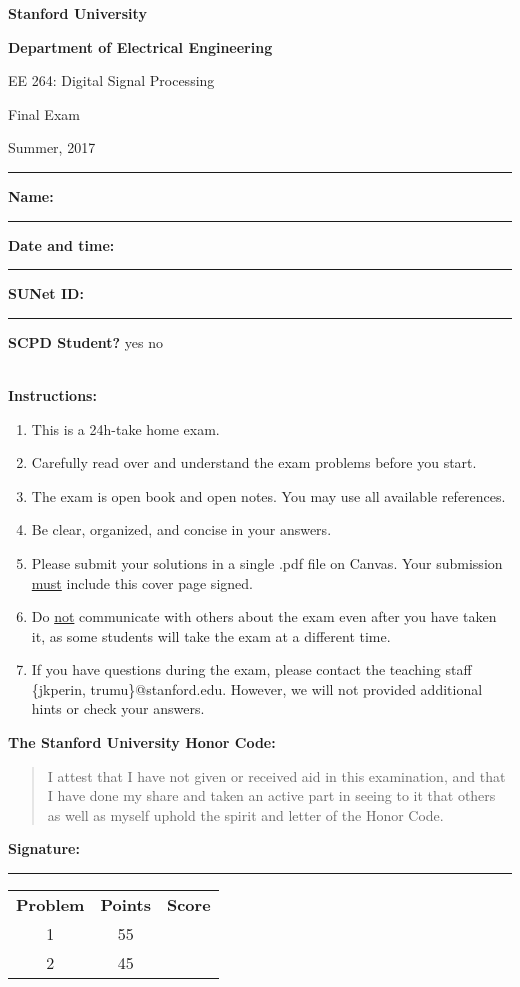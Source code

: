 \doublespacing
\begin{center}
\textbf{\Large Stanford University}

\textbf{\Large Department of Electrical Engineering}

\Large EE 264: Digital Signal Processing 

\Large Final Exam

\Large Summer, 2017
\end{center}
\vspace{-0.5cm}
\rule{\textwidth}{1pt}

\noindent\textbf{Name:} \rule{0.4\textwidth}{0.5pt} \qquad  \textbf{Date and time:} \rule{0.3\textwidth}{0.5pt}

\noindent\textbf{SUNet ID:} \rule{0.3\textwidth}{0.5pt}\qquad 
\textbf{SCPD Student?} yes no

\mbox{}\\
\textbf{Instructions:}
\singlespacing
\begin{enumerate}
\item This is a 24h-take home exam. 
\item Carefully read over and understand the exam problems before you start.
\item The exam is open book and open notes. You may use all available references.
\item Be clear, organized, and concise in your answers.
\item Please submit your solutions in a single .pdf file on Canvas. Your submission \underline{must} include this cover page signed. 
\item Do \underline{not} communicate with others about the exam even after you have taken it, as some students will take the exam at a different time.
\item If you have questions during the exam, please contact the teaching staff \{jkperin, trumu\}@stanford.edu. However, we will not provided additional hints or check your answers.
\end{enumerate}

\noindent\textbf{The Stanford University Honor Code:}
\begin{quote}
I attest that I have not given or received aid in this examination, and that I have done my share and taken an active part in seeing to it that others as well as myself uphold the spirit and letter of the Honor Code.
\end{quote}
\vspace{1mm}

\begin{center}\textbf{Signature:} \rule{0.7\textwidth}{0.5pt}\end{center}

\doublespacing
\vspace{0.1cm}
\begin{center}
\begin{tabular}{ccc}
\textbf{Problem} & \textbf{Points} & \textbf{Score} \\
1 & 55 & \\
2 & 45 & \\
\end{tabular}
\end{center}
\singlespacing